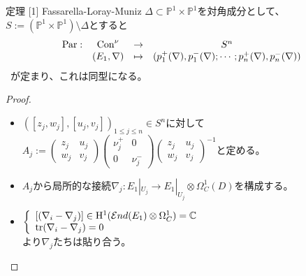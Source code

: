 \documentclass[dvipdfmx,notheorems]{beamer}
\theoremstyle{definition}
\begin{document}
\begin{frame}
    \begin{block}{定理 [1] Fassarella-Loray-Muniz}
        $\Delta \subset \mathbb{P}^1 \times \mathbb{P}^1$を対角成分として、
        $S:=(\mathbb{P}^1 \times \mathbb{P}^1)\setminus \Delta$とすると
        \begin{equation*}
            \begin{array}{rccc}
                {\rm Par}:&{\rm Con}^\nu & \rightarrow & S^n\\
                &(E_1,\nabla) & \mapsto & (p_1^+(\nabla),p_1^-(\nabla);\cdots ; p_n^+(\nabla),p_n^-(\nabla))
            \end{array}
        \end{equation*}\
        が定まり、これは同型になる。
    \end{block}
    \begin{proof}
        \begin{itemize}
            \item $([z_j,w_j],[u_j,v_j])_{1\leq j \leq n}\in S^n$に対して$A_j:=\left(
            \begin{array}{cc}
                z_j & u_j\\w_j&v_j
            \end{array}\right)
            \left(
            \begin{array}{cc}
                \nu_j^+ & 0\\0& \nu_j^-
            \end{array}\right)
            \left(
            \begin{array}{cc}
                z_j & u_j\\w_j&v_j
            \end{array}\right)^{-1}
            $と定める。
            \item $A_j$から局所的な接続$\nabla_j : E_1|_{U_j}\rightarrow E_1|_{U_j}\otimes \Omega^1_C(D)$を構成する。
            \item $\left\{
            \begin{array}{l}
                [(\nabla_i-\nabla_j)]\in {\rm H}^1(\mathcal{E}nd(E_1)\otimes \Omega_C^1)=\mathbb{C} \\
                {\rm tr}(\nabla_i - \nabla_j)=0
            \end{array}\right.$
            \\より$\nabla_j$たちは貼り合う。
        \end{itemize}
    \end{proof}
\end{frame}
\end{document}
